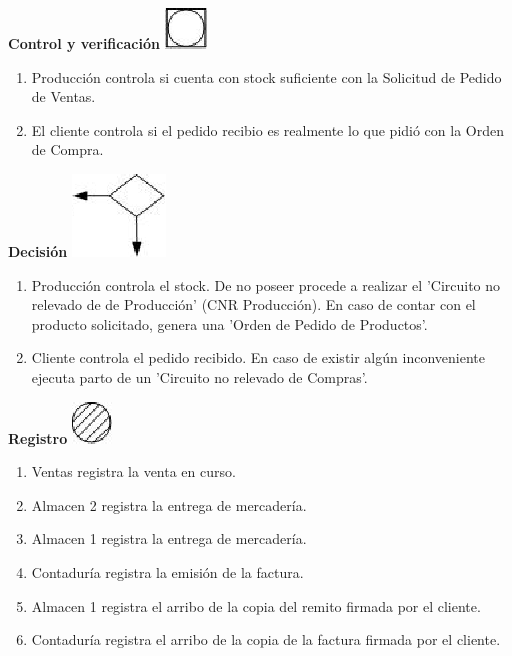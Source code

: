 \begin{center}
  \textbf{Control y verificación}
  \includegraphics{./Images/Simbolos/simbolo-Control-y-Verificacion.png}
\end{center}
\begin{enumerate}
	\item Producción controla si cuenta con stock suficiente con la Solicitud de Pedido de Ventas.
	\item El cliente controla si el pedido recibio es realmente lo que pidió con la Orden de Compra.
\end{enumerate}
\pagebreak

\begin{center}
  \textbf{Decisión}
  \includegraphics{./Images/Simbolos/simbolo-Decision.png}
\end{center}
\begin{enumerate}
  \item Producción controla el stock. De no poseer procede a realizar el 'Circuito no relevado de de Producción' (CNR Producción). En caso de contar con el producto solicitado, genera una 'Orden de Pedido de Productos'.
  \item Cliente controla el pedido recibido. En caso de existir algún inconveniente ejecuta parto de un 'Circuito no relevado de Compras'.
\end{enumerate}

\begin{center}
  \textbf{Registro}
  \includegraphics{./Images/Simbolos/simbolo-Registro.png}
\end{center}
\begin{enumerate}
  \item Ventas registra la venta en curso.
  \item Almacen 2 registra la entrega de mercadería.
  \item Almacen 1 registra la entrega de mercadería.
  \item Contaduría registra la emisión de la factura.
  \item Almacen 1 registra el arribo de la copia del remito firmada por el cliente.
  \item Contaduría registra el arribo de la copia de la factura firmada por el cliente.  
\end{enumerate}

